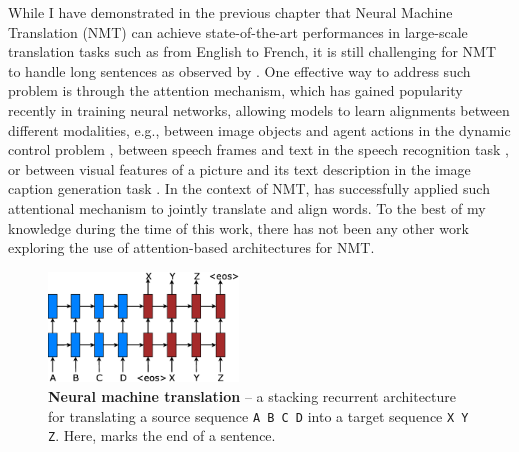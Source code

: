 
While I have demonstrated in the previous chapter that Neural Machine Translation (NMT) can achieve state-of-the-art performances in
large-scale translation tasks such as from English to French, it is still challenging for NMT to handle long sentences as observed by .
One effective way to address such problem is through the attention mechanism, which has gained popularity recently in
training neural networks, allowing models to learn alignments between different
modalities, e.g., between image objects and agent actions in the dynamic control
problem \cite{mnih14}, between speech frames and text in the speech recognition
task \cite{jan14},  or between visual features of a picture and its text
description in the image caption generation task \cite{xu15}. In the context of
NMT,  has successfully applied such attentional mechanism to
jointly translate and align words. To the best of my knowledge during the time of this work, there has not
been any other work exploring the use of attention-based architectures for NMT.

\begin{figure}
\centering
\includegraphics[width=0.45\textwidth, clip=true, trim= 0 0 0 0]{img/4-lstm} %
\caption[Neural machine translation]{{\bf Neural machine translation} -- a stacking recurrent architecture for translating a source sequence \texttt{A B C D} into a target sequence \texttt{X Y Z}. Here, \eos{} marks the end of a sentence.
} 
\label{f:lstm}
\end{figure}

